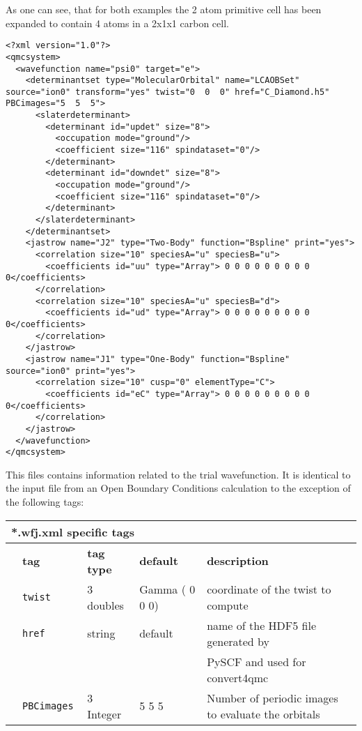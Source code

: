   As one can see, that for both examples the 2 atom primitive cell has been expanded to contain 4 atoms in a 2x1x1 carbon cell.
\begin{lstlisting}[caption=CDiamond.wfj-Twist0.xml. This file contains the trial wavefunction.]
<?xml version="1.0"?>
<qmcsystem>
  <wavefunction name="psi0" target="e">
    <determinantset type="MolecularOrbital" name="LCAOBSet" source="ion0" transform="yes" twist="0  0  0" href="C_Diamond.h5" PBCimages="5  5  5">
      <slaterdeterminant>
        <determinant id="updet" size="8">
          <occupation mode="ground"/>
          <coefficient size="116" spindataset="0"/>
        </determinant>
        <determinant id="downdet" size="8">
          <occupation mode="ground"/>
          <coefficient size="116" spindataset="0"/>
        </determinant>
      </slaterdeterminant>
    </determinantset>
    <jastrow name="J2" type="Two-Body" function="Bspline" print="yes">
      <correlation size="10" speciesA="u" speciesB="u">
        <coefficients id="uu" type="Array"> 0 0 0 0 0 0 0 0 0 0</coefficients>
      </correlation>
      <correlation size="10" speciesA="u" speciesB="d">
        <coefficients id="ud" type="Array"> 0 0 0 0 0 0 0 0 0 0</coefficients>
      </correlation>
    </jastrow>
    <jastrow name="J1" type="One-Body" function="Bspline" source="ion0" print="yes">
      <correlation size="10" cusp="0" elementType="C">
        <coefficients id="eC" type="Array"> 0 0 0 0 0 0 0 0 0 0</coefficients>
      </correlation>
    </jastrow>
  </wavefunction>
</qmcsystem>
 \end{lstlisting}
This files contains information related to the trial wavefunction. It is identical to the input file from an Open Boundary Conditions calculation to the exception of the following tags:\\
\begin{table}[h]
\begin{center}
\begin{tabularx}{\textwidth}{l l l l l }
\hline
\multicolumn{5}{l}{*.wfj.xml specific tags} \\
\hline
   &   \bfseries tag     & \bfseries tag type & \bfseries default   & \bfseries description \\
   &   \texttt{twist             } &  3 doubles  & Gamma ( 0 0 0)& coordinate of the twist to compute\\
   &   \texttt{href             } &  string  & default& name of the HDF5 file generated by\\ 
   &                              &          &        &  PySCF and used for convert4qmc\\  
   &   \texttt{PBCimages            } &  3 Integer   & 5 5 5  & Number of periodic images to evaluate the orbitals\\
    \hline
    \end{tabularx}
\end{center}
\end{table}

